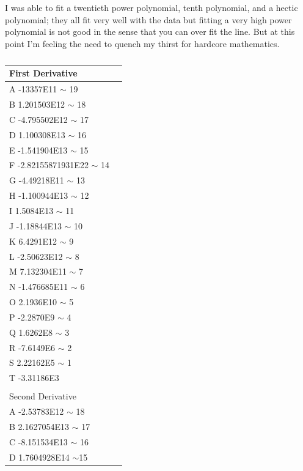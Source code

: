 \documentclass{article}
\begin{document}
I was able to fit a twentieth power polynomial, tenth polynomial, and a hectic polynomial; they all fit very well with the data but fitting a very high power polynomial is not good in the sense that you can over fit the line. But at this point I’m feeling the need to quench my thirst for hardcore mathematics.


\begin{table}[]
\centering
\caption{}
\label{nathantable2}
\begin{tabular}{@{}ll@{}}
\toprule
First Derivative               &  \\ \midrule
A -13357E11 $\sim$ 19          &  \\
B 1.201503E12 $\sim$ 18        &  \\
C -4.795502E12 $\sim$ 17       &  \\
D 1.100308E13 $\sim$ 16        &  \\
E -1.541904E13 $\sim$ 15       &  \\
F -2.82155871931E22 $\sim$ 14  &  \\
G -4.49218E11 $\sim$ 13        &  \\
H -1.100944E13 $\sim$ 12       &  \\
I 1.5084E13 $\sim$ 11          &  \\
J -1.18844E13 $\sim$ 10        &  \\
K 6.4291E12 $\sim$ 9           &  \\
L -2.50623E12 $\sim$ 8         &  \\
M 7.132304E11 $\sim$ 7         &  \\
N -1.476685E11 $\sim$ 6        &  \\
O 2.1936E10 $\sim$ 5           &  \\
P -2.2870E9 $\sim$ 4           &  \\
Q 1.6262E8 $\sim$ 3            &  \\
R -7.6149E6 $\sim$ 2           &  \\
S 2.22162E5 $\sim$ 1           &  \\
T -3.31186E3                   &  \\
                               &  \\
Second Derivative              &  \\
A -2.53783E12 $\sim$ 18        &  \\
B 2.1627054E13 $\sim$ 17       &  \\
C -8.151534E13 $\sim$ 16       &  \\
D 1.7604928E14 $\sim$15        &  \\

\end{tabular}
\end{table}
\end{document}
